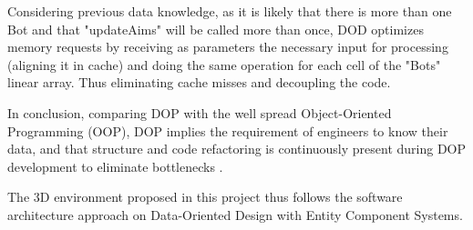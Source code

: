     Considering previous data knowledge, as it is likely that there is more than one Bot and that "updateAims" will be called more than once, DOD optimizes memory requests by receiving as parameters the necessary input for processing (aligning it in cache) and doing the same operation for each cell of the "Bots" linear array. Thus eliminating cache misses and decoupling the code.
    
    In conclusion, comparing DOP with the well spread Object-Oriented Programming (OOP), DOP implies the requirement of engineers to know their data, and that structure and code refactoring is continuously present during DOP development to eliminate bottlenecks \cite{albrecht-latency-elephant}.
    
    The 3D environment proposed in this project thus follows the software architecture approach on Data-Oriented Design with Entity Component Systems.



